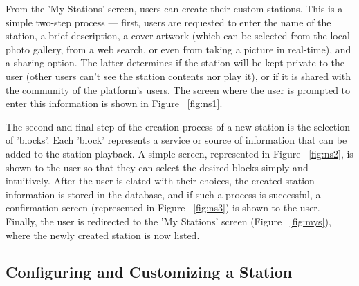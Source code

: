 From the 'My Stations' screen, users can create their custom stations. This is a simple two-step process  — first, users are requested to enter the name of the station, a brief description, a cover artwork (which can be selected from the local photo gallery, from a web search, or even from taking a picture in real-time), and a sharing option. The latter determines if the station will be kept private to the user (other users can't see the station contents nor play it), or if it is shared with the community of the platform's users. The screen where the user is prompted to enter this information is shown in Figure ~\ref{fig:ns1}.


The second and final step of the creation process of a new station is the selection of 'blocks'. Each 'block' represents a service or source of information that can be added to the station playback. A simple screen, represented in Figure ~\ref{fig:ns2}, is shown to the user so that they can select the desired blocks simply and intuitively. After the user is elated with their choices, the created station information is stored in the database, and if such a process is successful, a confirmation screen  (represented in Figure ~\ref{fig:ns3}) is shown to the user. Finally, the user is redirected to the 'My Stations' screen (Figure ~\ref{fig:mys}), where the newly created station is now listed.

\newpage
\subsection{Configuring and Customizing a Station}

